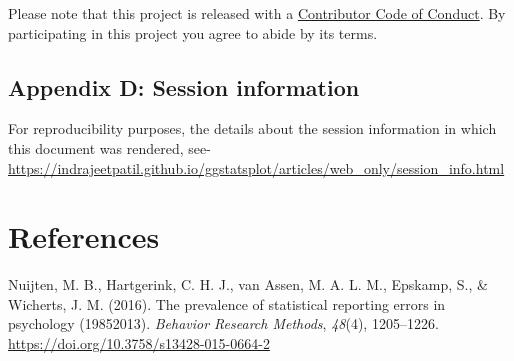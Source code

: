 \documentclass[]{article}
\begin{document}
Please note that this project is released with a
\href{https://github.com/IndrajeetPatil/ggstatsplot/blob/master/CODE_OF_CONDUCT.md}{Contributor
Code of Conduct}. By participating in this project you agree to abide by
its terms.

\hypertarget{appendix-d-session-information}{%
\subsection{Appendix D: Session
information}\label{appendix-d-session-information}}

For reproducibility purposes, the details about the session information
in which this document was rendered, see-
\url{https://indrajeetpatil.github.io/ggstatsplot/articles/web_only/session_info.html}

\hypertarget{references}{%
\section*{References}\label{references}}

\hypertarget{refs}{}
\leavevmode\hypertarget{ref-nuijtenPrevalenceStatisticalReporting2016}{}%
Nuijten, M. B., Hartgerink, C. H. J., van Assen, M. A. L. M., Epskamp,
S., \& Wicherts, J. M. (2016). The prevalence of statistical reporting
errors in psychology (19852013). \emph{Behavior Research Methods},
\emph{48}(4), 1205--1226.
\url{https://doi.org/10.3758/s13428-015-0664-2}
\end{document}
